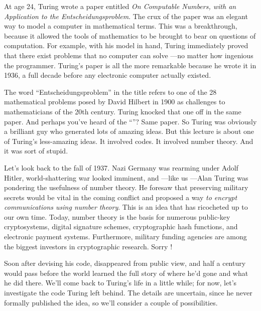 At age 24, Turing wrote a paper entitled \emph{On Computable Numbers,
  with an Application to the Entscheidungsproblem}.  The crux of the
paper was an elegant way to model a computer in mathematical terms.
This was a breakthrough, because it allowed the tools of mathematics
to be brought to bear on questions of computation.  For example, with
his model in hand, Turing immediately proved that there exist problems
that no computer can solve ---no matter how ingenious the programmer.
Turing's paper is all the more remarkable because he wrote it in 1936,
a full decade before any electronic computer actually existed.

The word ``Entscheidungsproblem'' in the title refers to one of the 28
mathematical problems posed by David Hilbert in 1900 as challenges to
mathematicians of the 20th century.  Turing knocked that one off in
the same paper.  And perhaps you've heard of the ``''?  Same paper.  So Turing was obviously a brilliant guy who
generated lots of amazing ideas.  But this lecture is about one of
Turing's less-amazing ideas.  It involved codes.  It involved number
theory.  And it was sort of stupid.


Let's look back to the fall of 1937.  Nazi Germany was rearming under
Adolf Hitler, world-shattering war looked imminent, and ---like us
---Alan Turing was pondering the usefulness of number theory.  He
foresaw that preserving military secrets would be vital in the coming
conflict and proposed a way \emph{to encrypt communications using
  number theory}.  This is an idea that has ricocheted up to our own
time.  Today, number theory is the basis for numerous public-key
cryptosystems, digital signature schemes, cryptographic hash
functions, and electronic payment systems.  Furthermore, military
funding agencies are among the biggest investors in cryptographic
research.  Sorry !

Soon after devising his code,  disappeared from public
view, and half a century would pass before the world learned the full
story of where he'd gone and what he did there.  We'll come back to
Turing's life in a little while; for now, let's investigate the code
Turing left behind.  The details are uncertain, since he never
formally published the idea, so we'll consider a couple of
possibilities.

